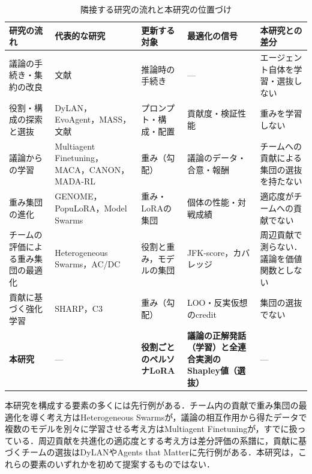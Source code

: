 \begin{table}[htbp]
\caption{隣接する研究の流れと本研究の位置づけ}
\label{tab:2.2}
\centering
\footnotesize
\setlength{\tabcolsep}{3pt}
\begin{tabular}{|p{2.5cm}|p{3.1cm}|p{2.2cm}|p{2.6cm}|p{3.1cm}|}
\hline
研究の流れ & 代表的な研究 & 更新する対象 & 最適化の信号 & 本研究との差分 \\
\hline
議論の手続き・集約の改良 & 文献\cite{du2023improving,liu2025dmad,toshniwal2025genselect,venkatraman2025rsa} & 推論時の手続き & --- & エージェント自体を学習・選抜しない \\
\hline
役割・構成の探索と選抜 & DyLAN\cite{liu2024dylan}，EvoAgent\cite{yuan2025evoagent}，MASS\cite{zhou2026mass}，文献\cite{zhang2026dynamic} & プロンプト・構成・配置 & 貢献度・検証性能 & 重みを学習しない \\
\hline
議論からの学習 & Multiagent Finetuning\cite{subramaniam2025multiagent}，MACA\cite{maca2025preference}，CANON\cite{gkountouras2026canon}，MADA-RL\cite{pulici2026madarl} & 重み（勾配） & 議論のデータ・合意・報酬 & チームへの貢献による集団の選抜を持たない \\
\hline
重み集団の進化 & GENOME\cite{zhang2025genome}，PopuLoRA\cite{creuscastanyer2026populora}，Model Swarms\cite{feng2024model} & 重み・LoRAの集団 & 個体の性能・対戦成績 & 適応度がチームへの貢献でない \\
\hline
チームの評価による重み集団の最適化 & Heterogeneous Swarms\cite{feng2025heterogeneous}，AC/DC\cite{dai2026acdc} & 役割と重み，モデルの集団 & JFK-score，カバレッジ & 周辺貢献で測らない．議論を価値関数としない \\
\hline
貢献に基づく強化学習 & SHARP\cite{li2026sharp}，C3\cite{chen2026trace} & 重み（勾配） & LOO・反実仮想のcredit & 集団の選抜でない \\
\hline
\textbf{本研究} & --- & \textbf{役割ごとのペルソナLoRA} & \textbf{議論の正解発話（学習）と全連合実測のShapley値（選抜）} & --- \\
\hline
\end{tabular}
\end{table}

本研究を構成する要素の多くには先行例がある．チーム内の貢献で重み集団の最適化を導く考え方はHeterogeneous Swarms\cite{feng2025heterogeneous}が，議論の相互作用から得たデータで複数のモデルを別々に学習させる考え方はMultiagent Finetuning\cite{subramaniam2025multiagent}が，すでに扱っている．周辺貢献を共進化の適応度とする考え方は差分評価の系譜\cite{agogino2008efficient,rodriquez2026snn}に，貢献に基づくチームの選抜はDyLAN\cite{liu2024dylan}やAgents that Matter\cite{lu2026agents}に先行例がある．本研究は，これらの要素のいずれかを初めて提案するものではない．

